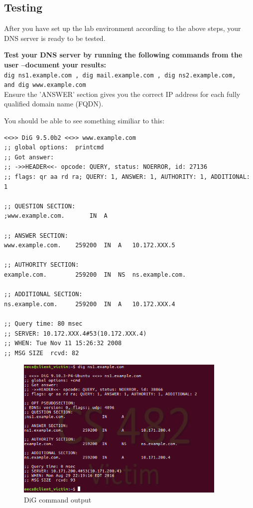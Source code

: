 \documentclass{article}
\begin{document}



\subsection{Testing}

After you have set up the lab environment according to the above steps, your DNS server is ready to be tested. 

\textbf{ \question Test your \ubuntu DNS server by running the following commands from the user \ubuntu --document your results: }\\
{\tt dig ns1.example.com , dig mail.example.com , dig  ns2.example.com, \\
and dig www.example.com}  \\Ensure the 'ANSWER' section gives you the correct IP address for each fully qualified domain name (FQDN).

You should be able to see something similiar to this:

\begin{verbatim}
<<>> DiG 9.5.0b2 <<>> www.example.com
;; global options:  printcmd
;; Got answer:
;; ->>HEADER<<- opcode: QUERY, status: NOERROR, id: 27136
;; flags: qr aa rd ra; QUERY: 1, ANSWER: 1, AUTHORITY: 1, ADDITIONAL: 1

;; QUESTION SECTION:
;www.example.com.		IN	A

;; ANSWER SECTION:
www.example.com.	259200	IN	A	10.172.XXX.5

;; AUTHORITY SECTION:
example.com.		259200	IN	NS	ns.example.com.

;; ADDITIONAL SECTION:
ns.example.com.		259200	IN	A	10.172.XXX.4

;; Query time: 80 msec
;; SERVER: 10.172.XXX.4#53(10.172.XXX.4)
;; WHEN: Tue Nov 11 15:26:32 2008
;; MSG SIZE  rcvd: 82
\end{verbatim}

\begin{figure}[!htb]
\centering
\includegraphics*
[width=0.9\textwidth]
{DIG_output.png}
\caption{DiG command output} 
\label{fig:environment}
\end{figure}
\end{document}
